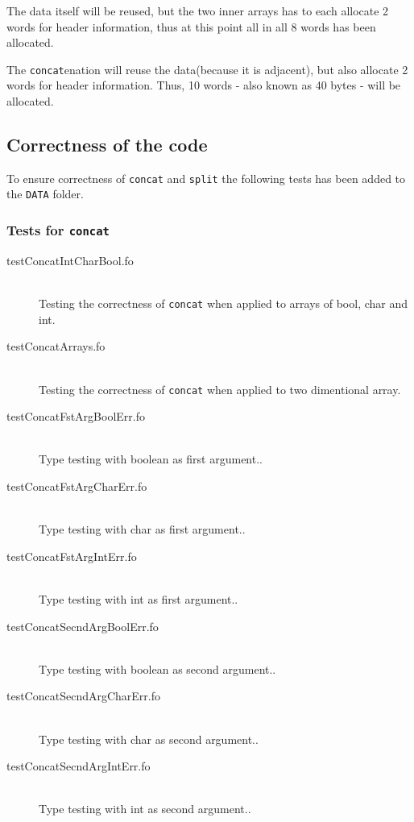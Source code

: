 \documentclass[11pt,a4paper]{article}
\begin{document}
The data itself will be reused, but the two inner arrays has to each allocate
2 words for header information, thus at this point all in all 8 words has been allocated.

The \texttt{concat}enation will reuse the data(because it is adjacent), but
also allocate 2 words for header information. Thus, 10 words - also known
as 40 bytes -  will be allocated.

\subsection{Correctness of the code}
To ensure correctness of \texttt{concat} and \texttt{split} the following
tests has been added to the \texttt{DATA} folder.

\subsubsection{Tests for \texttt{concat}}

\begin{description}
  \item[testConcatIntCharBool.fo] \hfill \\
  Testing the correctness of \texttt{concat} when applied to arrays of bool,
  char and int.
  \item[testConcatArrays.fo] \hfill \\
  Testing the correctness of \texttt{concat} when applied to two dimentional
  array.
  \item[testConcatFstArgBoolErr.fo] \hfill \\
  Type testing with boolean as first argument..
  \item[testConcatFstArgCharErr.fo] \hfill \\
  Type testing with char as first argument..
  \item[testConcatFstArgIntErr.fo] \hfill \\
  Type testing with int as first argument..
  \item[testConcatSecndArgBoolErr.fo] \hfill \\
  Type testing with boolean as second argument..
  \item[testConcatSecndArgCharErr.fo] \hfill \\
  Type testing with char as second argument..
  \item[testConcatSecndArgIntErr.fo] \hfill \\
  Type testing with int as second argument..
\end{description}
\end{document}
